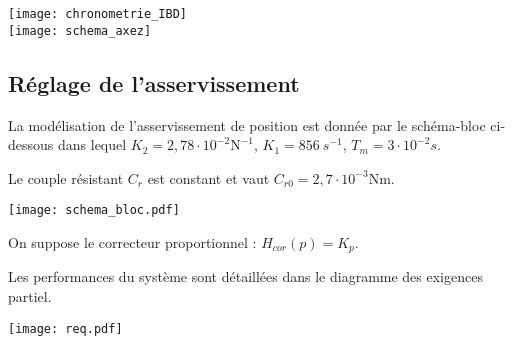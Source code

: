 \begin{marginfigure}
\texttt{[image: chronometrie\_IBD]}\\
\texttt{[image: schema\_axez]}
\end{marginfigure}


\subsection*{Réglage de l'asservissement}


La modélisation de l'asservissement de position est donnée par le schéma-bloc ci-dessous dans lequel $K_2 = 2,78 \cdot 10^{-2} \text{N}^{-1}$, $K_1 = \SI{856}{s^{-1}}$, $T_m= 3\cdot  10^{-2} s$.

Le couple résistant $C_r$ est constant et vaut $C_{r0} = 2,7 \cdot 10^{-3} \text{Nm}$.



\begin{marginfigure}
\texttt{[image: schema\_bloc.pdf]}
\end{marginfigure}

On suppose le correcteur proportionnel : $H_{cor}(p)=K_p$.

Les performances du système sont détaillées dans le diagramme des exigences partiel.%


	\begin{marginfigure}
			\texttt{[image: req.pdf]}
    \end{marginfigure}





